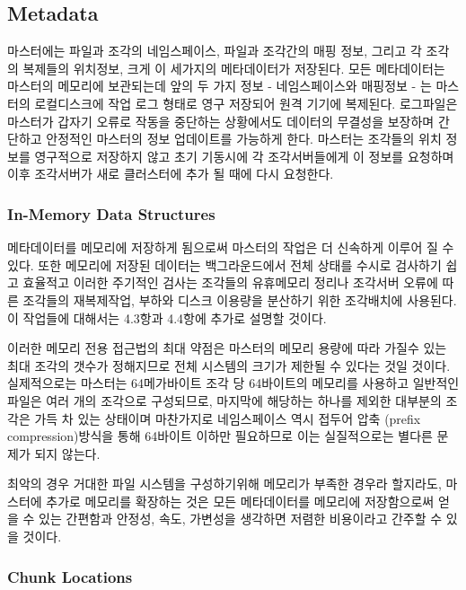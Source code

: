 \documentclass[twocolumn]{article}
\begin{document}
\subsection{Metadata}

 마스터에는 파일과 조각의 네임스페이스, 파일과 조각간의 매핑 정보, 그리고 각 조각의 복제들의 위치정보, 크게 이 세가지의 메타데이터가 저장된다.  모든 메타데이터는 마스터의 메모리에 보관되는데 앞의 두 가지 정보 - 네임스페이스와 매핑정보 - 는 마스터의 로컬디스크에 작업 로그 형태로 영구 저장되어 원격 기기에 복제된다. 로그파일은 마스터가 갑자기 오류로 작동을 중단하는 상황에서도 데이터의 무결성을 보장하며 간단하고 안정적인 마스터의 정보 업데이트를 가능하게 한다.  마스터는 조각들의 위치 정보를 영구적으로 저장하지 않고 초기 기동시에 각 조각서버들에게 이 정보를 요청하며 이후 조각서버가 새로 클러스터에 추가 될 때에 다시 요청한다.

\subsubsection{In-Memory Data Structures}

  메타데이터를 메모리에 저장하게 됨으로써 마스터의 작업은 더 신속하게 이루어 질 수 있다.  또한 메모리에 저장된 데이터는 백그라운드에서 전체 상태를 수시로 검사하기 쉽고 효율적고 이러한 주기적인 검사는 조각들의 유휴메모리 정리나 조각서버 오류에 따른 조각들의 재복제작업, 부하와 디스크 이용량을 분산하기 위한 조각배치에 사용된다.  이 작업들에 대해서는 4.3항과 4.4항에 추가로 설명할 것이다.

 이러한 메모리 전용 접근법의 최대 약점은 마스터의 메모리 용량에 따라 가질수 있는 최대 조각의 갯수가 정해지므로 전체 시스템의 크기가 제한될 수 있다는 것일 것이다.  실제적으로는 마스터는 64메가바이트 조각 당 64바이트의 메모리를 사용하고 일반적인 파일은 여러 개의 조각으로 구성되므로, 마지막에 해당하는 하나를 제외한 대부분의 조각은 가득 차 있는 상태이며 마찬가지로 네임스페이스 역시 접두어 압축 (prefix compression)방식을 통해 64바이트 이하만 필요하므로 이는 실질적으로는 별다른 문제가 되지 않는다.

최악의 경우 거대한 파일 시스템을 구성하기위해 메모리가 부족한 경우라 할지라도, 마스터에 추가로 메모리를 확장하는 것은 모든 메타데이터를 메모리에 저장함으로써 얻을 수 있는 간편함과 안정성, 속도, 가변성을 생각하면 저렴한 비용이라고 간주할 수 있을 것이다.

\subsubsection{Chunk Locations}
\end{document}
